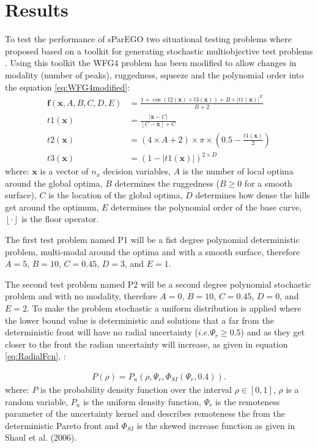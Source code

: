 \documentclass[10pt]{llncs}
\newcommand{\brr}[1]{{\left({#1}\right)}} %
\newcommand{\vx}{\mathbf{x}} %
\newcommand{\vf}{\mathbf{f}} %
\newcommand{\floor}[1]{\left\lfloor #1 \right\rfloor} %
\begin{document}
\section{Results}
\label{sec:results}

To test the performance of sParEGO two situational testing problems where proposed based on a toolkit for generating stochastic multiobjective test problems \cite{Salomon2016Toolkit}. Using this toolkit the WFG4 problem has been modified to allow changes in modality (number of peaks), ruggedness, squeeze and the polynomial order into the equation \ref{eq:WFG4modified}:
\begin{equation}
\begin{aligned}
	\vf\brr{\vx, A, B, C, D, E} &= \frac{1+ \cos \brr{t2(\vx) \times t3(\vx)} + B\times |t1(\vx)|^E}{B+2}	\\
	t1(\vx) &= \frac{|\vx-C|}{\floor{C-\vx}+C} \\
	t2(\vx) &= \brr{4 \times A +2}\times\pi\times\brr{0.5 - \frac{t1(\vx)}{2}} \\
	t3(\vx) &= \brr{1-|t1(\vx)|}^{2\times D} 
\end{aligned}
\label{eq:WFG4modified}
\end{equation} 
where: $\vx$ is a vector of $n_x$ decision variables, $A$ is the number of local optima around the global optima, $B$ determines the ruggedness ($B \geq 0$ for a smooth surface), $C$ is the location of the global optima, $D$ determines how dense the hills get around the optimum, $E$ determines the polynomial order of the base curve, $\floor{\cdot}$ is the floor operator.

The first test problem named P1 will be a fist degree polynomial deterministic problem, multi-modal around the optima and with a smooth surface, therefore $A = 5$, $B = 10$, $C = 0.45$, $D = 3$, and $E = 1$. 

The second test problem named P2 will be a second degree polynomial stochastic problem and with no modality, therefore $A = 0$, $B = 10$, $C = 0.45$, $D = 0$, 	and $E = 2$. To make the problem stochastic a uniform distribution is applied where the lower bound value is deterministic and solutions that a far from the deterministic front will have no radial uncertainty ($i.e. \Psi_r \geq 0.5$) and as they get closer to the front the radian uncertainty will increase, as given in equation \ref{eq:RadialFcn}, \cite{Salomon2016Toolkit}: 

\begin{align}
	\label{eq:RadialFcn} P\brr{\rho} = P_u\brr{\rho,\Psi_r,\Phi_{SI}\brr{\Psi_r , 0.4}}.
\end{align} 
where: $P$ is the probability density function over the interval $\rho \in [0,1]$, $\rho$ is a random variable, $P_u$ is the uniform density function, $\Psi_r$ is the remoteness parameter of the uncertainty kernel and describes remoteness the from the deterministic Pareto front and $\Phi_{SI}$ is the skewed increase function as given in Shaul et al. (2006).     
\end{document}
